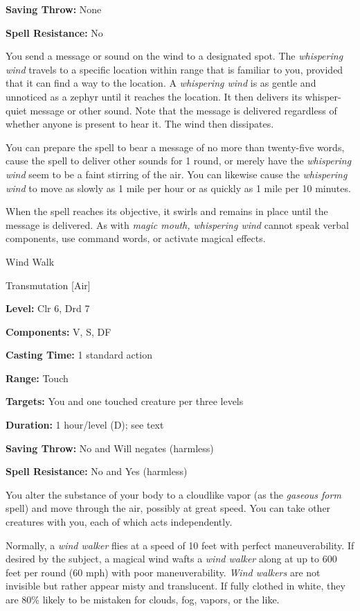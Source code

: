 \documentclass{article}
\begin{document}
\textbf{Saving Throw:} None

\textbf{Spell Resistance:} No

You send a message or sound on the wind to a designated spot. The \textit{whispering 
wind }travels to a specific location within range that is familiar to you, provided 
that it can find a way to the location. A \textit{whispering wind }is as gentle 
and unnoticed as a zephyr until it reaches the location. It then delivers its whisper-quiet 
message or other sound. Note that the message is delivered regardless of whether 
anyone is present to hear it. The wind then dissipates.

You can prepare the spell to bear a message of no more than twenty-five words, 
cause the spell to deliver other sounds for 1 round, or merely have the \textit{whispering 
wind }seem to be a faint stirring of the air. You can likewise cause the \textit{whispering 
wind }to move as slowly as 1 mile per hour or as quickly as 1 mile per 10 minutes.

When the spell reaches its objective, it swirls and remains in place until the 
message is delivered. As with \textit{magic mouth, whispering wind }cannot speak 
verbal components, use command words, or activate magical effects.

\vspace{12pt}
Wind Walk

Transmutation [Air]

\textbf{Level:} Clr 6, Drd 7

\textbf{Components:} V, S, DF

\textbf{Casting Time:} 1 standard action

\textbf{Range:} Touch

\textbf{Targets:} You and one touched creature per three levels

\textbf{Duration:} 1 hour/level (D); see text

\textbf{Saving Throw:} No and Will negates (harmless)

\textbf{Spell Resistance:} No and Yes (harmless)

You alter the substance of your body to a cloudlike vapor (as the \textit{gaseous 
form }spell) and move through the air, possibly at great speed. You can take other 
creatures with you, each of which acts independently.

Normally, a \textit{wind walker }flies at a speed of 10 feet with perfect maneuverability. 
If desired by the subject, a magical wind wafts a \textit{wind walker }along at 
up to 600 feet per round (60 mph) with poor maneuverability. \textit{Wind walkers 
}are not invisible but rather appear misty and translucent. If fully clothed in 
white, they are 80\% likely to be mistaken for clouds, fog, vapors, or the like.
\end{document}
